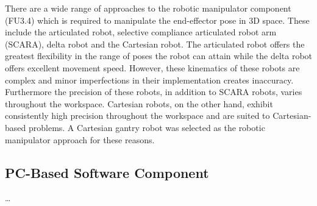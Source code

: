  There are a wide range of approaches to the robotic manipulator component (FU3.4) which is required to manipulate the end-effector pose in 3D space. These include the articulated robot, selective compliance articulated robot arm (SCARA), delta robot and the Cartesian robot. The articulated robot offers the greatest flexibility in the range of poses the robot can attain while the delta robot offers excellent movement speed. However, these kinematics of these robots are complex and minor imperfections in their implementation creates inaccuracy. Furthermore the precision of these robots, in addition to SCARA robots, varies throughout the workspace. Cartesian robots, on the other hand, exhibit consistently high precision throughout the workspace and are suited to Cartesian-based problems. A Cartesian gantry robot was selected as the robotic manipulator approach for these reasons.


\subsection{PC-Based Software Component}

\ldots


\newpage



